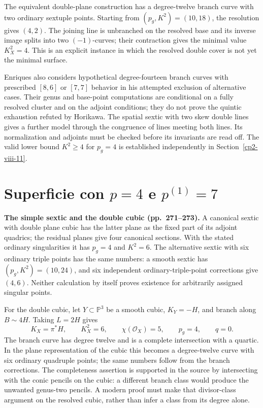 The equivalent double-plane construction has a degree-twelve branch curve with two ordinary sextuple points. Starting from \((p_g,K^2)=(10,18)\), the resolution gives \((4,2)\). The joining line is unbranched on the resolved base and its inverse image splits into two \((-1)\)-curves; their contraction gives the minimal value \(K_X^2=4\). This is an explicit instance in which the resolved double cover is not yet the minimal surface.

Enriques also considers hypothetical degree-fourteen branch curves with prescribed \([8,6]\) or \([7,7]\) behavior in his attempted exclusion of alternative cases. Their genus and base-point computations are conditional on a fully resolved cluster and on the adjoint conditions; they do not prove the quintic exhaustion refuted by Horikawa. The spatial sextic with two skew double lines gives a further model through the congruence of lines meeting both lines. Its normalization and adjoints must be checked before its invariants are read off. The valid lower bound \(K^2\geq4\) for \(p_g=4\) is established independently in Section~\ref{cp2-viii-11}.

\section{Superficie con \texorpdfstring{$p=4$}{p=4} e \texorpdfstring{$p^{(1)}=7$}{p(1)=7}}
\label{cp2-viii-3}

\textbf{The simple sextic and the double cubic (pp.~271--273).}
A canonical sextic with double plane cubic has the latter plane as the fixed part of its adjoint quadrics; the residual planes give four canonical sections. With the stated ordinary singularities it has \(p_g=4\) and \(K^2=6\). The alternative sextic with six ordinary triple points has the same numbers: a smooth sextic has \((p_g,K^2)=(10,24)\), and six independent ordinary-triple-point corrections give \((4,6)\). Neither calculation by itself proves existence for arbitrarily assigned singular points.

For the double cubic, let \(Y\subset\mathbb P^3\) be a smooth cubic, \(K_Y=-H\), and branch along \(B\sim4H\). Taking \(L=2H\) gives
\[
K_X=\pi^*H,\qquad K_X^2=6,\qquad
\chi(\mathcal O_X)=5,\qquad p_g=4,\qquad q=0.
\]
The branch curve has degree twelve and is a complete intersection with a quartic. In the plane representation of the cubic this becomes a degree-twelve curve with six ordinary quadruple points; the same numbers follow from the branch corrections. The completeness assertion is supported in the source by intersecting with the conic pencils on the cubic: a different branch class would produce the unwanted genus-two pencils. A modern proof must make that divisor-class argument on the resolved cubic, rather than infer a class from its degree alone.

